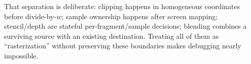 That separation is deliberate: clipping happens in homogeneous coordinates before divide-by-\(w\); sample ownership happens after screen mapping; stencil/depth are stateful per-fragment/sample decisions; blending combines a surviving source with an existing destination. Treating all of them as ``rasterization'' without preserving these boundaries makes debugging nearly impossible.
